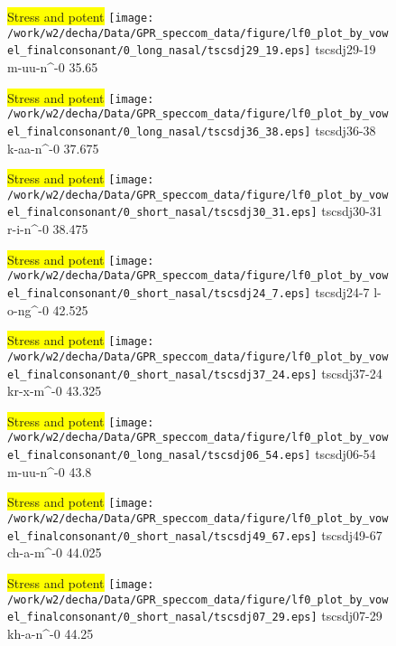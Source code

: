 \documentclass{article}
\begin{document}
\begin{figure}[t]
\begin{minipage}[b]{.24\textwidth}
\colorbox{yellow}{Stress and potent}
\centering
\texttt{[image: /work/w2/decha/Data/GPR\_speccom\_data/figure/lf0\_plot\_by\_vowel\_finalconsonant/0\_long\_nasal/tscsdj29\_19.eps]}
tscsdj29-19 m-uu-n\textasciicircum-0 35.65
\end{minipage}
\begin{minipage}[b]{.24\textwidth}
\colorbox{yellow}{Stress and potent}
\centering
\texttt{[image: /work/w2/decha/Data/GPR\_speccom\_data/figure/lf0\_plot\_by\_vowel\_finalconsonant/0\_long\_nasal/tscsdj36\_38.eps]}
tscsdj36-38 k-aa-n\textasciicircum-0 37.675
\end{minipage}
\begin{minipage}[b]{.24\textwidth}
\colorbox{yellow}{Stress and potent}
\centering
\texttt{[image: /work/w2/decha/Data/GPR\_speccom\_data/figure/lf0\_plot\_by\_vowel\_finalconsonant/0\_short\_nasal/tscsdj30\_31.eps]}
tscsdj30-31 r-i-n\textasciicircum-0 38.475
\end{minipage}
\begin{minipage}[b]{.24\textwidth}
\colorbox{yellow}{Stress and potent}
\centering
\texttt{[image: /work/w2/decha/Data/GPR\_speccom\_data/figure/lf0\_plot\_by\_vowel\_finalconsonant/0\_short\_nasal/tscsdj24\_7.eps]}
tscsdj24-7 l-o-ng\textasciicircum-0 42.525
\end{minipage}
\end{figure}

\begin{figure}[t]
\begin{minipage}[b]{.24\textwidth}
\colorbox{yellow}{Stress and potent}
\centering
\texttt{[image: /work/w2/decha/Data/GPR\_speccom\_data/figure/lf0\_plot\_by\_vowel\_finalconsonant/0\_short\_nasal/tscsdj37\_24.eps]}
tscsdj37-24 kr-x-m\textasciicircum-0 43.325
\end{minipage}
\begin{minipage}[b]{.24\textwidth}
\colorbox{yellow}{Stress and potent}
\centering
\texttt{[image: /work/w2/decha/Data/GPR\_speccom\_data/figure/lf0\_plot\_by\_vowel\_finalconsonant/0\_long\_nasal/tscsdj06\_54.eps]}
tscsdj06-54 m-uu-n\textasciicircum-0 43.8
\end{minipage}
\begin{minipage}[b]{.24\textwidth}
\colorbox{yellow}{Stress and potent}
\centering
\texttt{[image: /work/w2/decha/Data/GPR\_speccom\_data/figure/lf0\_plot\_by\_vowel\_finalconsonant/0\_short\_nasal/tscsdj49\_67.eps]}
tscsdj49-67 ch-a-m\textasciicircum-0 44.025
\end{minipage}
\begin{minipage}[b]{.24\textwidth}
\colorbox{yellow}{Stress and potent}
\centering
\texttt{[image: /work/w2/decha/Data/GPR\_speccom\_data/figure/lf0\_plot\_by\_vowel\_finalconsonant/0\_short\_nasal/tscsdj07\_29.eps]}
tscsdj07-29 kh-a-n\textasciicircum-0 44.25
\end{minipage}
\end{figure}
\end{document}
